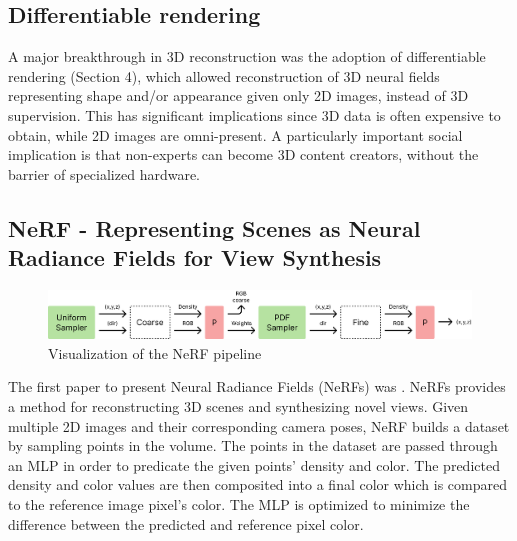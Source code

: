 \subsection{Differentiable rendering}
A major breakthrough in 3D reconstruction was the adoption of differentiable rendering (Section 4), which allowed reconstruction of 3D neural fields representing shape and/or appearance given only 2D images, instead of 3D supervision. This has significant implications since 3D data is often expensive to obtain, while 2D images are omni-present. A particularly important social implication is that non-experts can become 3D content creators, without the barrier of specialized hardware. \cite{xieNeuralFieldsVisual2022}



\subsection{NeRF - Representing Scenes as Neural Radiance Fields for View Synthesis}

\begin{figure}
    \centering
    \includegraphics[width=1.0\textwidth]{figures/NeRF_Pipeline.png}
    \caption{Visualization of the NeRF pipeline}
    \label{fig:nerf-pipeline}
\end{figure}

The first paper to present Neural Radiance Fields (NeRFs) was \cite{mildenhall_nerf_2020}. NeRFs provides a method for reconstructing 3D scenes and synthesizing novel views. Given multiple 2D images and their corresponding camera poses, NeRF builds a dataset by sampling points in the volume. The points in the dataset are passed through an MLP in order to predicate the given points' density and color. The predicted density and color values are then composited into a final color which is compared to the reference image pixel's color. The MLP is optimized to minimize the difference between the predicted and reference pixel color.


